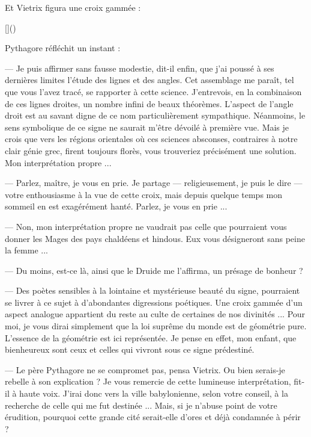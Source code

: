 \documentclass[a4paper, 11pt, oneside, polutonikogreek, french]{article}
\begin{document}
Et Vietrix figura une croix gammée :

[]()

Pythagore réfléchit un instant :

--- Je puis affirmer sans fausse modestie, dit-il enfin, que j'ai poussé à ses dernières limites l'étude des lignes et des angles. Cet assemblage me paraît, tel que vous l'avez tracé, se rapporter à cette science. J'entrevois, en la combinaison de ces lignes droites, un nombre infini de beaux théorèmes. L'aspect de l'angle droit est au savant digne de ce nom particulièrement sympathique. Néanmoins, le sens symbolique de ce signe ne saurait m'être dévoilé à première vue. Mais je crois que vers les régions orientales où ces sciences absconses, contraires à notre clair génie grec, firent toujours florès, vous trouveriez précisément une solution. Mon interprétation propre ...

--- Parlez, maître, je vous en prie. Je partage --- religieusement, je puis le dire --- votre enthousiasme à la vue de cette croix, mais depuis quelque temps mon sommeil en est exagérément hanté. Parlez, je vous en prie ...

--- Non, mon interprétation propre ne vaudrait pas celle que pourraient vous donner les Mages des pays chaldéens et hindous. Eux vous désigneront sans peine la femme ...

--- Du moins, est-ce là, ainsi que le Druide me l'affirma, un présage de bonheur ?

--- Des poètes sensibles à la lointaine et mystérieuse beauté du signe, pourraient se livrer à ce sujet à d'abondantes digressions poétiques. Une croix gammée d'un aspect analogue appartient du reste au culte de certaines de nos divinités ... Pour moi, je vous dirai simplement que la loi suprême du monde est de géométrie pure. L'essence de la géométrie est ici représentée. Je pense en effet, mon enfant, que bienheureux sont ceux et celles qui vivront sous ce signe prédestiné.

\bigskip
\centerline{\EightStarTaper}
\centerline{\EightStarTaper\EightStarTaper}
\bigskip

--- Le père Pythagore ne se compromet pas, pensa Vietrix. Ou bien serais-je rebelle à son explication ? Je vous remercie de cette lumineuse interprétation, fit-il à haute voix. J'irai donc vers la ville babylonienne, selon votre conseil, à la recherche de celle qui me fut destinée ... Mais, si je n'abuse point de votre érudition, pourquoi cette grande cité serait-elle d'ores et déjà condamnée à périr ?
\end{document}
